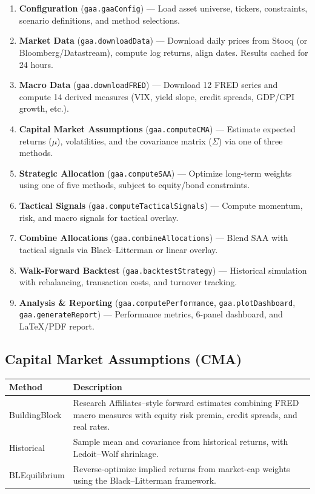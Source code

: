 \documentclass[11pt,a4paper]{article}
\begin{document}
\begin{enumerate}[leftmargin=2em]
  \item \textbf{Configuration} (\texttt{gaa.gaaConfig}) --- Load asset universe, tickers, constraints, scenario definitions, and method selections.
  \item \textbf{Market Data} (\texttt{gaa.downloadData}) --- Download daily prices from Stooq (or Bloomberg/Datastream), compute log returns, align dates. Results cached for 24 hours.
  \item \textbf{Macro Data} (\texttt{gaa.downloadFRED}) --- Download 12 FRED series and compute 14 derived measures (VIX, yield slope, credit spreads, GDP/CPI growth, etc.).
  \item \textbf{Capital Market Assumptions} (\texttt{gaa.computeCMA}) --- Estimate expected returns ($\mu$), volatilities, and the covariance matrix ($\Sigma$) via one of three methods.
  \item \textbf{Strategic Allocation} (\texttt{gaa.computeSAA}) --- Optimize long-term weights using one of five methods, subject to equity/bond constraints.
  \item \textbf{Tactical Signals} (\texttt{gaa.computeTacticalSignals}) --- Compute momentum, risk, and macro signals for tactical overlay.
  \item \textbf{Combine Allocations} (\texttt{gaa.combineAllocations}) --- Blend SAA with tactical signals via Black--Litterman or linear overlay.
  \item \textbf{Walk-Forward Backtest} (\texttt{gaa.backtestStrategy}) --- Historical simulation with rebalancing, transaction costs, and turnover tracking.
  \item \textbf{Analysis \& Reporting} (\texttt{gaa.computePerformance}, \texttt{gaa.plotDashboard}, \texttt{gaa.generateReport}) --- Performance metrics, 6-panel dashboard, and \LaTeX/PDF report.
\end{enumerate}

\subsection{Capital Market Assumptions (CMA)}
\begin{center}
\begin{tabularx}{\textwidth}{l X}
\toprule
\textbf{Method} & \textbf{Description} \\
\midrule
BuildingBlock & Research Affiliates--style forward estimates combining FRED macro measures with equity risk premia, credit spreads, and real rates. \\
Historical & Sample mean and covariance from historical returns, with Ledoit--Wolf shrinkage. \\
BLEquilibrium & Reverse-optimize implied returns from market-cap weights using the Black--Litterman framework. \\
\bottomrule
\end{tabularx}
\end{center}
\end{document}
